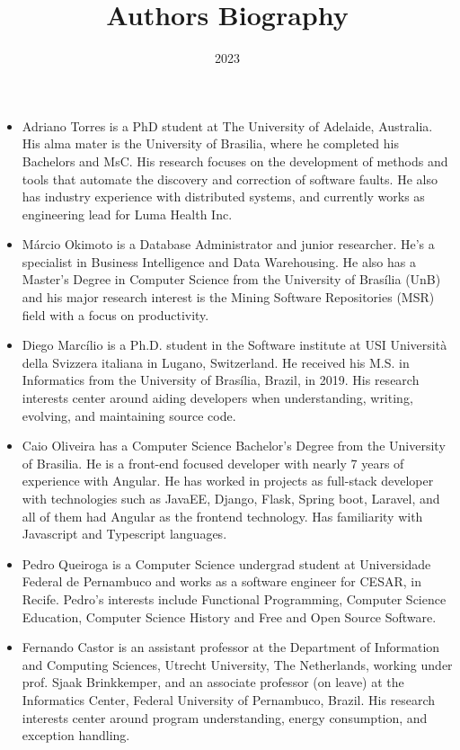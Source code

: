 \documentclass{article}
\date{2023}
\title{Authors Biography}
\begin{document}
\maketitle

\begin{itemize}

\item Adriano Torres is a PhD student at The University of Adelaide, Australia. His alma mater is the University of Brasilia, where he completed his Bachelors and MsC. His research focuses on the development of methods and tools that automate the discovery and correction of software faults. He also has industry experience with distributed systems, and currently works as engineering lead for Luma Health Inc.

\item M\'{a}rcio Okimoto is a Database Administrator and junior researcher. He's a specialist in Business Intelligence and Data Warehousing. He also has a Master's Degree in Computer Science from the University of Brasília (UnB) and his major research interest is the Mining Software Repositories (MSR) field with a focus on productivity.

\item Diego Marc\'{i}lio is a Ph.D. student in the Software institute at USI Università della Svizzera italiana in Lugano, Switzerland.
He received his M.S. in Informatics from the University of Brasília, Brazil, in 2019. His research interests center around aiding developers when understanding, writing, evolving, and maintaining source code.  
  
\item Caio Oliveira has a Computer Science Bachelor's Degree from the University of Brasilia. He is a front-end focused developer with nearly 7
  years of experience with Angular. He has worked in projects as full-stack developer with technologies such as JavaEE, Django, Flask, Spring boot, Laravel, and all of
  them had Angular as the frontend technology. Has familiarity with Javascript and Typescript languages.

  \item Pedro Queiroga is a Computer Science undergrad student at Universidade Federal de Pernambuco and works as a software engineer for CESAR, in Recife. Pedro's interests include Functional Programming, Computer Science Education, Computer Science History and Free and Open Source Software.
  
\item Fernando Castor is an assistant professor at the Department of Information and Computing Sciences, Utrecht University, The Netherlands,  working under prof. Sjaak Brinkkemper, and an associate professor (on leave) at the Informatics Center, Federal University of Pernambuco, Brazil. His research interests center around program understanding, energy consumption, and exception handling. 
  

\end{itemize}
\end{document}
